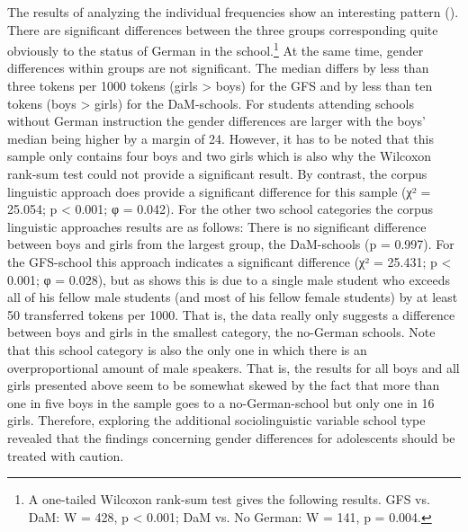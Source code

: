 \documentclass[output=paper]{langsci/langscibook}
\begin{document}
The results of analyzing the individual frequencies show an interesting pattern (). There are significant differences between the three groups corresponding quite obviously to the status of German in the school.\footnote{A one-tailed Wilcoxon rank-sum test gives the following results. GFS vs. DaM: W = 428, p < 0.001; DaM vs. No German: W = 141, p = 0.004.} At the same time, gender differences within groups are not significant. The median differs by less than three tokens per 1000 tokens (girls > boys) for the GFS and by less than ten tokens (boys > girls) for the DaM-schools. For students attending schools without German instruction the gender differences are larger with the boys’ median being higher by a margin of 24. However, it has to be noted that this sample only contains four boys and two girls which is also why the Wilcoxon rank-sum test could not provide a significant result. By contrast, the corpus linguistic approach does provide a significant difference for this sample (χ² = 25.054; p < 0.001; φ = 0.042). For the other two school categories the corpus linguistic approaches results are as follows: There is no significant difference between boys and girls from the largest group, the DaM-schools (p = 0.997). For the GFS-school this approach indicates a significant difference (χ² = 25.431; p < 0.001; φ = 0.028), but as  shows this is due to a single male student who exceeds all of his fellow male students (and most of his fellow female students) by at least 50 transferred tokens per 1000. That is, the data really only suggests a difference between boys and girls in the smallest category, the no-German schools. Note that this school category is also the only one in which there is an overproportional amount of male speakers. That is, the results for all boys and all girls presented above seem to be somewhat skewed by the fact that more than one in five boys in the sample goes to a no-German-school but only one in 16 girls. Therefore, exploring the additional sociolinguistic variable school type revealed that the findings concerning gender differences for adolescents should be treated with caution.

  
  
\end{document}
